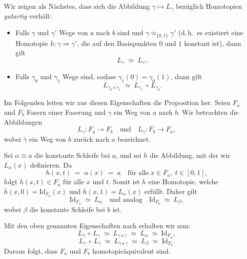 \documentclass[12pt, hidelinks]{article}
\numberwithin{conj}{section}
\begin{document}
Wir zeigen als Nächstes, dass sich die Abbildung \(\gamma \mapsto L_\gamma\) bezüglich Homotopien \cite[Prop.~4.61]{hatcher2001} \emph{gutartig} verhält:
\begin{itemize}[noitemsep]
    \item Falls \(\gamma\) und \(\gamma'\) Wege von \(a\) nach \(b\) sind und
          \(\gamma \simeq_{\{0,1\}} \gamma'\)
          (d.\,h.\ es existiert eine Homotopie \(h : \gamma \Rightarrow \gamma'\), die auf den Basispunkten \(0\) und \(1\) konstant ist), dann gilt
          \[
              L_\gamma \;\simeq\; L_{\gamma'}.
          \]
    \item Falls \(\gamma_0\) und \(\gamma_1\) Wege sind, sodass \(\gamma_1(0) = \gamma_0(1)\), dann gilt
          \[
              L_{\gamma_0 \star \gamma_1}
              \;\simeq\;
              L_{\gamma_1} \,\circ\, L_{\gamma_0}.
          \]
\end{itemize}
Im Folgenden leiten wir aus diesen Eigenschaften die Proposition her. Seien \(F_a\) und \(F_b\) Fasern einer Faserung und \(\gamma\) ein Weg von \(a\) nach \(b\). Wir betrachten die Abbildungen
\[
    L_\gamma : F_a \longrightarrow F_b
    \quad\text{und}\quad
    L_{\overline{\gamma}} : F_b \longrightarrow F_a,
\]
wobei \(\overline{\gamma}\) ein Weg von \(b\) zurück nach \(a\) bezeichnet.

\smallskip

Sei \(\alpha \equiv a\) die konstante Schleife bei \(a\), und sei \(\overline{h}\) die Abbildung, mit der wir \(L_\alpha(x)\) definieren. Da
\[
    h(x,t) \;=\; \alpha(x) \;=\; a
    \quad\text{für alle}\;
    x\in F_a,\; t\in [0,1],
\]
folgt \(\overline{h}(x,t) \in F_a\) für alle \(x\) und \(t\). Somit ist \(\overline{h}\) eine Homotopie, welche \(\overline{h}(x,0) = \mathrm{Id}_{F_a}(x)\) und \(\overline{h}(x,1) = L_\alpha(x)\) erfüllt. Daher gilt
\[
    \mathrm{Id}_{F_a}
    \;\simeq\;
    L_\alpha
    \quad\text{und analog}\quad
    \mathrm{Id}_{F_b}
    \;\simeq\;
    L_\beta,
\]
wobei \(\beta\) die konstante Schleife bei \(b\) ist.

\smallskip

Mit den oben genannten Eigenschaften nach \cite[Prop.~4.61]{hatcher2001} erhalten wir nun:
\[
    L_{\overline{\gamma}} \,\circ\, L_\gamma
    \;\simeq\;
    L_{\gamma \star \overline{\gamma}}
    \;\simeq\;
    L_\alpha
    \;\simeq\;
    \mathrm{Id}_{F_a},
\]
\[
    L_{\gamma} \,\circ\, L_{\overline{\gamma}}
    \;\simeq\;
    L_{\overline{\gamma} \star \gamma}
    \;\simeq\;
    L_\beta
    \;\simeq\;
    \mathrm{Id}_{F_b}.
\]
Daraus folgt, dass \(F_a\) und \(F_b\) homotopieäquivalent sind.
\end{document}
